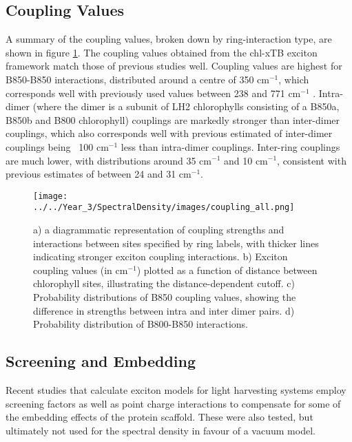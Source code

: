 \subsection{Coupling Values}
\label{subsec:coupling_values}

A summary of the coupling values, broken down by ring-interaction type, are shown
in figure \ref{fig:coupling_all}. 
The coupling values obtained from the chl-xTB exciton framework match those of previous
studies well. Coupling values are highest for B850-B850 interactions, distributed
around a centre of 350 $\text{cm}^{-1}$, which corresponds well with previously 
used values between 238 and 771 $\text{cm}^{-1}$ \cite{Cogdell2006}. Intra-dimer
(where the dimer is a subunit of LH2 chlorophylls consisting of a B850a, B850b and
B800 chlorophyll) couplings are markedly stronger than inter-dimer couplings, which
also corresponds well with previous estimated of inter-dimer couplings being ~100 
$\text{cm}^{-1}$ less than intra-dimer couplings. Inter-ring couplings are much 
lower, with distributions around 35 $\text{cm}^{-1}$ and 10 $\text{cm}^{-1}$, consistent
with previous estimates of between 24 and 31 $\text{cm}^{-1}$.

\begin{figure}
    \centering
    \texttt{[image: ../../Year\_3/SpectralDensity/images/coupling\_all.png]}
    \label{fig:coupling_all}
    \caption{a) a diagrammatic representation of coupling strengths and interactions
    between sites specified by ring labels, with thicker lines indicating stronger
    exciton coupling interactions. b) Exciton coupling values (in $\text{cm}^{-1}$)
    plotted as a function of distance between chlorophyll sites, illustrating the
    distance-dependent cutoff. c) Probability distributions of B850 coupling values,
    showing the difference in strengths between intra and inter dimer pairs. d) 
    Probability distribution of B800-B850 interactions.}
\end{figure}

\subsection{Screening and Embedding}
\label{subsec:screening}

Recent studies that calculate exciton models for light harvesting systems employ
screening factors as well as point charge interactions to compensate for some of
the embedding effects of the protein scaffold. These were also tested, but ultimately
not used for the spectral density in favour of a vacuum model.

